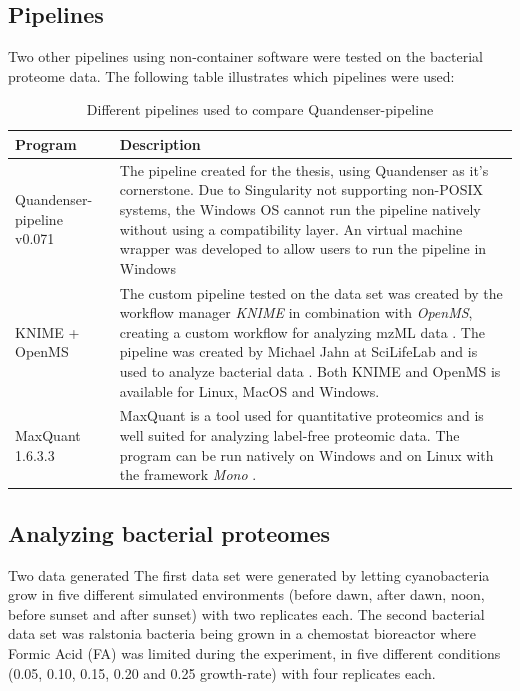 \subsection{Pipelines}

Two other pipelines using non-container software were tested on the bacterial proteome data. The following table illustrates which pipelines were used:

\newcommand{\textone}{\small The pipeline created for the thesis, using Quandenser as it's cornerstone. Due to Singularity not supporting non-POSIX systems, the Windows OS cannot run the pipeline natively without using a compatibility layer. An virtual machine wrapper was developed to allow users to run the pipeline in Windows}
\newcommand{\texttwo}{\small The custom pipeline tested on the data set was created by the workflow manager \textit{KNIME} in combination with \textit{OpenMS}, creating a custom workflow for analyzing mzML data \cite{knime} \cite{openms}. The pipeline was created by Michael Jahn at SciLifeLab and is used to analyze bacterial data \cite{m-jahn-pipeline}. Both KNIME and OpenMS is available for Linux, MacOS and Windows.}
\newcommand{\textthree}{\small MaxQuant is a tool used for quantitative proteomics and is well suited for analyzing label-free proteomic data. The program can be run natively on Windows and on Linux with the framework \textit{Mono} \cite{maxquant} \cite{maxquant-installation}.}

\begin{table}[H]
\caption{Different pipelines used to compare Quandenser-pipeline}
\begin{center}
\begin{tabular}{|p{4cm}|p{9cm}|}
\hline
Program & Description \\ \hline \hline
Quandenser-pipeline v0.071 & \textone \\ \hline
KNIME + OpenMS & \texttwo \\ \hline
MaxQuant 1.6.3.3 & \textthree \\ \hline
\end{tabular}
\end{center}
\end{table}

\subsection{Analyzing bacterial proteomes}
Two data generated The first data set were generated by letting cyanobacteria grow in five different simulated environments (before dawn, after dawn, noon, before sunset and after sunset) with two replicates each. The second bacterial data set was ralstonia bacteria being grown in a chemostat bioreactor where Formic Acid (FA) was limited during the experiment, in five different conditions (0.05, 0.10, 0.15, 0.20 and 0.25 growth-rate) with four replicates each.

